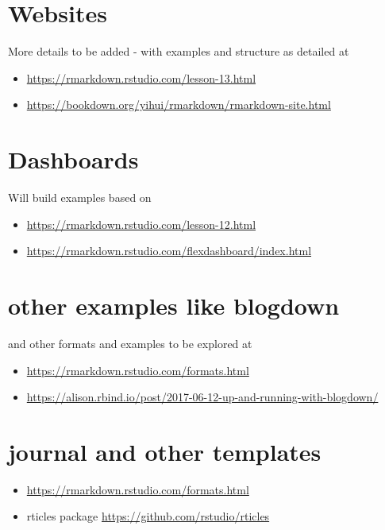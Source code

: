 \documentclass[
]{book}
\providecommand{\tightlist}{%
  \setlength{\itemsep}{0pt}\setlength{\parskip}{0pt}}
\begin{document}
\hypertarget{websites}{%
\section{Websites}\label{websites}}

More details to be added - with examples and structure as detailed at

\begin{itemize}
\tightlist
\item
  \url{https://rmarkdown.rstudio.com/lesson-13.html}
\item
  \url{https://bookdown.org/yihui/rmarkdown/rmarkdown-site.html}
\end{itemize}

\hypertarget{dashboards}{%
\section{Dashboards}\label{dashboards}}

Will build examples based on

\begin{itemize}
\tightlist
\item
  \url{https://rmarkdown.rstudio.com/lesson-12.html}
\item
  \url{https://rmarkdown.rstudio.com/flexdashboard/index.html}
\end{itemize}

\hypertarget{other-examples-like-blogdown}{%
\section{other examples like blogdown}\label{other-examples-like-blogdown}}

and other formats and examples to be explored at

\begin{itemize}
\tightlist
\item
  \url{https://rmarkdown.rstudio.com/formats.html}
\item
  \url{https://alison.rbind.io/post/2017-06-12-up-and-running-with-blogdown/}
\end{itemize}

\hypertarget{journal-and-other-templates}{%
\section{journal and other templates}\label{journal-and-other-templates}}

\begin{itemize}
\tightlist
\item
  \url{https://rmarkdown.rstudio.com/formats.html}
\item
  rticles package \url{https://github.com/rstudio/rticles}
\end{itemize}
\end{document}
